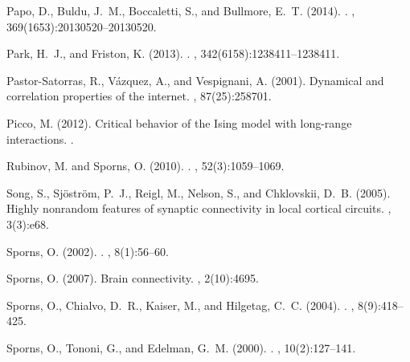 \documentclass[preprintnumbers,amsmath,amssymb,onecolumn]{revtex4}
\begin{document}
\begin{thebibliography}{99}
Papo, D., Buldu, J.~M., Boccaletti, S., and Bullmore, E.~T. (2014).
.
, 369(1653):20130520--20130520.

Park, H.~J., and Friston, K. (2013). 
. 
, 342(6158):1238411--1238411. 

Pastor-Satorras, R., V{\'a}zquez, A., and Vespignani, A. (2001).
\newblock Dynamical and correlation properties of the internet.
, 87(25):258701.

Picco, M. (2012).
\newblock Critical behavior of the Ising model with long-range interactions.
.

Rubinov, M. and Sporns, O. (2010).
.
, 52(3):1059--1069.

Song, S., Sj{\"o}str{\"o}m, P.~J., Reigl, M., Nelson, S., and Chklovskii, D.~B.
  (2005).
\newblock Highly nonrandom features of synaptic connectivity in local cortical
  circuits.
, 3(3):e68.

Sporns, O. (2002).
.
, 8(1):56--60.

Sporns, O. (2007).
\newblock Brain connectivity.
, 2(10):4695.

Sporns, O., Chialvo, D.~R., Kaiser, M., and Hilgetag, C.~C. (2004).
.
, 8(9):418--425.

Sporns, O., Tononi, G., and Edelman, G.~M. (2000).
.
, 10(2):127--141.


\end{thebibliography}
\end{document}
